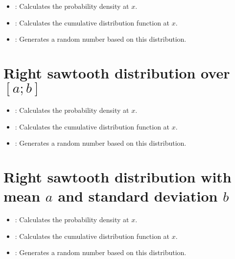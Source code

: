\begin{itemize}

\item
{}:
Calculates the probability density at $x$.

\item
{}:
Calculates the cumulative distribution function at $x$.

\item
{}:
Generates a random number based on this distribution.

\end{itemize}



\section{Right sawtooth distribution over \texorpdfstring{$[a;b]$}{[a;b]}}

\begin{itemize}

\item
{}:
Calculates the probability density at $x$.

\item
{}:
Calculates the cumulative distribution function at $x$.

\item
{}:
Generates a random number based on this distribution.

\end{itemize}



\section{Right sawtooth distribution with mean \texorpdfstring{$a$}{a} and standard deviation \texorpdfstring{$b$}{b}}

\begin{itemize}

\item
{}:
Calculates the probability density at $x$.

\item
{}:
Calculates the cumulative distribution function at $x$.

\item
{}:
Generates a random number based on this distribution.

\end{itemize}



